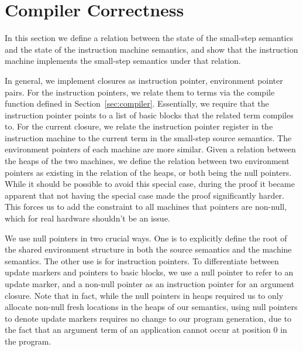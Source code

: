 \section{Compiler Correctness} \label{sec:correctness}

In this section we define a relation between the state of the small-step
semantics and the state of the instruction machine semantics, and show that the
instruction machine implements the small-step semantics under that relation. 

In general, we implement closures as instruction pointer, environment pointer
pairs. For the instruction pointers, we relate them to terms via the compile
function defined in Section~\ref{sec:compiler}. Essentially, we require that the
instruction pointer points to a list of basic blocks that the related term
compiles to. For the current closure, we relate the instruction pointer register
in the instruction machine to the current term in the small-step source
semantics. The environment pointers of each machine are more similar. Given a
relation between the heaps of the two machines, we define the relation between
two environment pointers as existing in the relation of the heaps, or both being
the null pointers. While it should be possible to avoid this special case,
during the proof it became apparent that not having the special case made the
proof significantly harder. This forces us to add the constraint to all machines
that pointers are non-null, which for real hardware shouldn't be an issue.  

We use null pointers in two crucial ways. One is to explicitly define the root
of the shared environment structure in both the source semantics and the machine
semantics. The other use is for instruction pointers. To differentiate between update
markers and pointers to basic blocks, we use a null pointer to refer to an
update marker, and a non-null pointer as an
instruction pointer for an argument closure. Note that in fact, while the null
pointers in heaps required us to only allocate non-null fresh locations in the
heaps of our semantics, using null pointers to denote update markers requires no
change to our program generation, due to the fact that an argument term of an
application cannot occur at position 0 in the program.

